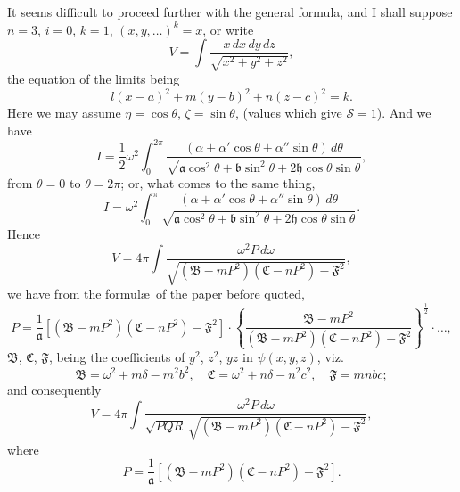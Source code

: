 \documentclass[11pt,a4paper]{book}
\begin{document}
It seems difficult to proceed further with the general formula, and I shall suppose $n = 3$, $i = 0$, $k = 1$, $(x, y, \ldots)^{k} = x$, or write
\[
V = \int \frac{x\, dx\, dy\, dz}{\sqrt{x^{2} + y^{2} + z^{2}}},
\]
the equation of the limits being
\[
l(x-a)^{2} + m(y-b)^{2} + n(z-c)^{2} = k.
\]
Here we may assume $\eta = \cos\theta$, $\zeta = \sin\theta$, (values which give $\mathcal{S} = 1$). And we have
\[
I = \frac{1}{2}\omega^{2} \int_{0}^{2\pi} \frac{(\alpha + \alpha'\cos\theta + \alpha''\sin\theta)\, d\theta}{\sqrt{\mathfrak{a}\cos^{2}\theta + \mathfrak{b}\sin^{2}\theta + 2\mathfrak{h}\cos\theta\sin\theta}},
\]
from $\theta = 0$ to $\theta = 2\pi$; or, what comes to the same thing,
\[
I = \omega^{2} \int_{0}^{\pi} \frac{(\alpha + \alpha'\cos\theta + \alpha''\sin\theta)\, d\theta}{\sqrt{\mathfrak{a}\cos^{2}\theta + \mathfrak{b}\sin^{2}\theta + 2\mathfrak{h}\cos\theta\sin\theta}}.
\]
Hence
\[
V = 4\pi \int \frac{\omega^{2}P\, d\omega}{\sqrt{(\mathfrak{B} - mP^{2})(\mathfrak{C} - nP^{2}) - \mathfrak{F}^{2}}},
\]
we have from the formul\ae\ of the paper before quoted,
\[
P = \frac{1}{\mathfrak{a}}\left[(\mathfrak{B} - mP^{2})(\mathfrak{C} - nP^{2}) - \mathfrak{F}^{2}\right] \cdot \left\{\frac{\mathfrak{B} - mP^{2}}{(\mathfrak{B} - mP^{2})(\mathfrak{C} - nP^{2}) - \mathfrak{F}^{2}}\right\}^{\frac{1}{2}} \cdot \ldots,
\]
$\mathfrak{B}$, $\mathfrak{C}$, $\mathfrak{F}$, being the coefficients of $y^{2}$, $z^{2}$, $yz$ in $\psi(x, y, z)$, viz.
\[
\mathfrak{B} = \omega^{2} + m\delta - m^{2}b^{2}, \quad \mathfrak{C} = \omega^{2} + n\delta - n^{2}c^{2}, \quad \mathfrak{F} = mnbc;
\]
and consequently
\[
V = 4\pi \int \frac{\omega^{2}P\, d\omega}{\sqrt{PQR}\, \sqrt{(\mathfrak{B} - mP^{2})(\mathfrak{C} - nP^{2}) - \mathfrak{F}^{2}}},
\]
where
\[
P = \frac{1}{\mathfrak{a}}\left[(\mathfrak{B} - mP^{2})(\mathfrak{C} - nP^{2}) - \mathfrak{F}^{2}\right].
\]

\newpage

\setcounter{page}{444}
\end{document}
